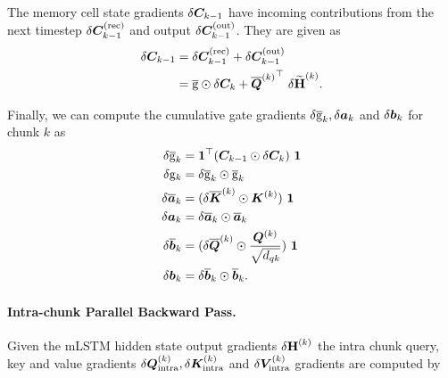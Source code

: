 \documentclass{article}
\begin{document}
    The memory cell state gradients $\delta \bm{C}_{k-1}$ have incoming contributions from the next timestep $\delta \bm{C}_{k-1}^{(\text{rec})}$ and output $\delta \bm{C}_{k-1}^{(\text{out})}$. They are given as
    \begin{align}
        \delta \bm{C}_{k-1} & = \delta \bm{C}_{k-1}^{(\text{rec})} + \delta \bm{C}_{k-1}^{(\text{out})}                                      \\
                         & = \overline{\mathrm{g}} \odot \delta \bm{C}_{k} + {\overline{\bm{Q}}^{(k)}}^\top \ \delta \widetilde{\bm{\mathrm{H}}}^{(k)}.
    \end{align}


    Finally, we can compute the cumulative gate gradients $\delta \overline{\mathrm{g}}_k, \delta \bm{a}_k$ and  $\delta \bm{b}_k$ for chunk $k$ as
    \begin{align}
        \delta \overline{\mathrm{g}}_k & = \bm{1}^\top (\bm{C}_{k-1} \odot \delta \bm{C}_k) \ \bm{1}                          \\
        \delta \mathrm{g}_k            & = \delta \overline{\mathrm{g}}_k \odot \overline{\mathrm{g}}_k                               \\
        \delta \overline{\bm{a}}_k & = ( \delta \overline{\bm{K}}^{(k)} \odot \bm{K}^{(k)} ) \ \bm{1}                     \\
        \delta \bm{a}_k            & = \delta \overline{\bm{a}}_k \odot \overline{\bm{a}}_k                               \\
        \delta \overline{\bm{b}}_k & = (\delta \overline{\bm{Q}}^{(k)} \odot \frac{\bm{Q}^{(k)}}{\sqrt{d_{qk}}}) \ \bm{1} \\
        \delta \bm{b}_k            & = \delta \overline{\bm{b}}_k \odot \overline{\bm{b}}_k.
    \end{align}





    \paragraph{Intra-chunk Parallel Backward Pass.}
    Given the mLSTM hidden state output gradients $\delta \bm{\mathrm{H}}^{(k)}$ the intra chunk query, key and value gradients $\delta {\bm{Q}}^{(k)}_\text{intra}, \delta {\bm{K}}^{(k)}_\text{intra}$ and $\delta {\bm{V}}^{(k)}_\text{intra}$ gradients are computed by
\end{document}
